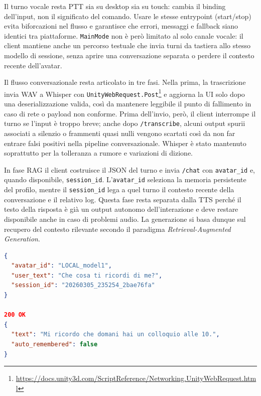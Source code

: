 Il turno vocale resta PTT sia su desktop sia su touch: cambia il binding dell'input, non il significato del comando. Usare le stesse entrypoint (start/stop) evita biforcazioni nel flusso e garantisce che errori, messaggi e fallback siano identici tra piattaforme. \texttt{MainMode} non è però limitato al solo canale vocale: il client mantiene anche un percorso testuale che invia turni da tastiera allo stesso modello di sessione, senza aprire una conversazione separata o perdere il contesto recente dell'avatar.

Il flusso conversazionale resta articolato in tre fasi. Nella prima, la trascrizione invia WAV a Whisper con \texttt{UnityWebRequest.Post}\footnote{\url{https://docs.unity3d.com/ScriptReference/Networking.UnityWebRequest.html}} e aggiorna la UI solo dopo una deserializzazione valida, così da mantenere leggibile il punto di fallimento in caso di rete o payload non conforme. Prima dell'invio, però, il client interrompe il turno se l'input è troppo breve; anche dopo \texttt{/transcribe}, alcuni output spurii associati a silenzio o frammenti quasi nulli vengono scartati così da non far entrare falsi positivi nella pipeline conversazionale. Whisper è stato mantenuto soprattutto per la tolleranza a rumore e variazioni di dizione\cite{Radford2023Whisper}.

In fase RAG il client costruisce il JSON del turno e invia \texttt{/chat} con \texttt{avatar\_id} e, quando disponibile, \texttt{session\_id}. L'\texttt{avatar\_id} seleziona la memoria persistente del profilo, mentre il \texttt{session\_id} lega a quel turno il contesto recente della conversazione e il relativo log. Questa fase resta separata dalla TTS perché il testo della risposta è già un output autonomo dell'interazione e deve restare disponibile anche in caso di problemi audio. La generazione si basa dunque sul recupero del contesto rilevante secondo il paradigma \emph{Retrieval-Augmented Generation}\cite{Lewis2020RAG}.

\begin{lstlisting}[language=json,style=sfpayload,title={POST /chat},caption={Versione compatta del turno inviato dal client e dei campi letti davvero in UI.}]
{
  "avatar_id": "LOCAL_model1",
  "user_text": "Che cosa ti ricordi di me?",
  "session_id": "20260305_235254_2bae76fa"
}

200 OK
{
  "text": "Mi ricordo che domani hai un colloquio alle 10.",
  "auto_remembered": false
}
\end{lstlisting}

